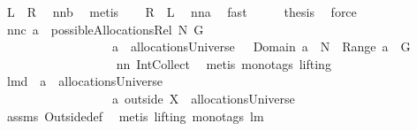 \begin{isabellebody}
\ {\isachardoublequoteopen}{\isacharquery}L\ {\isasymsubseteq}\ {\isacharquery}R{\isachardoublequoteclose}\ \isamarkupfalse%
\ nn{}{}b\ \isamarkupfalse%
\ metis\ \isamarkupfalse%
\ \isamarkupfalse%
\ {\isachardoublequoteopen}{\isacharquery}R\ {\isasymsubseteq}\ {\isacharquery}L{\isachardoublequoteclose}\ \isamarkupfalse%
\ nn{}{}a\ \isamarkupfalse%
\ fast\isanewline
\ \ \isamarkupfalse%
\ \isamarkupfalse%
\ {\isacharquery}thesis\ \isamarkupfalse%
\ force\isanewline
{}\isamarkupfalse%
%
\endisatagproof
{\isafoldproof}%
%
\isadelimproof
\isanewline
%
\endisadelimproof
\isanewline
{}\isamarkupfalse%
\ nn{}{}c{\isacharcolon}\ {\isachardoublequoteopen}a\ {\isasymin}\ possibleAllocationsRel\ N\ G\ \ {\isacharequal}\ \isanewline
\ \ \ \ \ \ \ \ \ \ \ \ \ \ \ \ \ \ {\isacharparenleft}a\ {\isasymin}\ allocationsUniverse\ \ {\isacharampersand}\ {\isacharparenleft}Domain\ a{\isacharparenright}\ {\isasymsubseteq}\ N\ {\isacharampersand}\ {\isacharparenleft}{\isasymUnion}Range\ a{\isacharparenright}\ {\isacharequal}\ G{\isacharparenright}{\isachardoublequoteclose}\ \isanewline
%
\isadelimproof
\ \ \ \ \ \ \ \ \ \ \ \ \ \ \ \ \ %
\endisadelimproof
%
\isatagproof
{}\isamarkupfalse%
\ nn{}{}\ Int{\isacharunderscore}Collect\ \isamarkupfalse%
\ {\isacharparenleft}metis\ {\isacharparenleft}mono{\isacharunderscore}tags{\isacharcomma}\ lifting{\isacharparenright}{\isacharparenright}%
\endisatagproof
{\isafoldproof}%
%
\isadelimproof
\isanewline
%
\endisadelimproof
\isanewline
{}\isamarkupfalse%
\ lm{}{}d{\isacharcolon}\ \ {\isachardoublequoteopen}a\ {\isasymin}\ allocationsUniverse{\isachardoublequoteclose}\ \isanewline
\ \ \ \ \ \ \ \ \ \ \ \ \ \ \ \ \ \ {\isachardoublequoteopen}a\ outside\ X\ {\isasymin}\ allocationsUniverse{\isachardoublequoteclose}\ \isanewline
%
\isadelimproof
\ \ \ \ \ \ \ \ \ \ \ \ \ \ \ \ \ %
\endisadelimproof
%
\isatagproof
{}\isamarkupfalse%
\ assms\ Outside{\isacharunderscore}def\ \isamarkupfalse%
\ {\isacharparenleft}metis\ {\isacharparenleft}lifting{\isacharcomma}\ mono{\isacharunderscore}tags{\isacharparenright}\ lm{}{}{\isacharparenright}%
\endisatagproof
{\isafoldproof}%
%
\isadelimproof
%
\endisadelimproof

\end{isabellebody}
